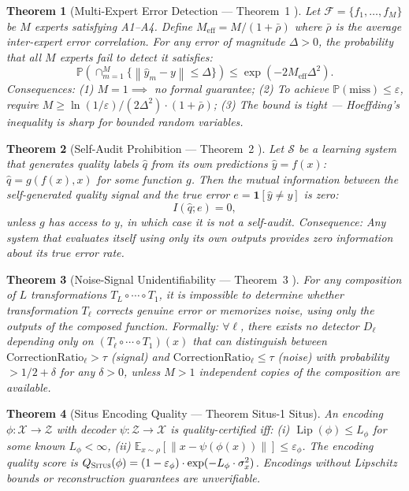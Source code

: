 \documentclass[12pt,a4paper]{article}
\newtheorem{theorem}{Theorem}[section]
\theoremstyle{definition}
\newcommand{\Situs}{\textsc{Situs}}
\DeclareMathOperator{\Lip}{Lip}
\newcommand{\E}{\mathbb{E}}
\newcommand{\Pbb}{\mathbb{P}}
\newcommand{\cF}{\mathcal{F}}
\newcommand{\cS}{\mathcal{S}}
\newcommand{\cX}{\mathcal{X}}
\newcommand{\cZ}{\mathcal{Z}}
\newcommand{\ind}[1]{\mathbf{1}[#1]}
\newcommand{\norm}[1]{\left\lVert#1\right\rVert}
\begin{document}
\begin{theorem}[Multi-Expert Error Detection — Theorem~1 ]
\label{thm:1_formal}
Let $\cF = \{f_1, \ldots, f_M\}$ be $M$ experts satisfying A1--A4. Define $M_{\text{eff}} = M/(1+\bar{\rho})$ where $\bar{\rho}$ is the average inter-expert error correlation. For any error of magnitude $\Delta > 0$, the probability that all $M$ experts fail to detect it satisfies:
\[
\Pbb(\cap_{m=1}^M \{\norm{\hat{y}_m - y} \le \Delta\}) \le \exp(-2M_{\text{eff}}\Delta^2).
\]
\textit{Consequences:} (1) $M=1 \implies$ no formal guarantee; (2) To achieve $\Pbb(\text{miss}) \le \varepsilon$, require $M \ge \ln(1/\varepsilon)/(2\Delta^2) \cdot (1+\bar{\rho})$; (3) The bound is tight — Hoeffding's inequality is sharp for bounded random variables.
\end{theorem}

\begin{theorem}[Self-Audit Prohibition — Theorem~2 ]
\label{thm:2_formal}
Let $\cS$ be a learning system that generates quality labels $\hat{q}$ from its own predictions $\hat{y} = f(x)$: $\hat{q} = g(f(x), x)$ for some function $g$. Then the mutual information between the self-generated quality signal and the true error $e = \ind{\hat{y} \neq y}$ is zero:
\[
I(\hat{q}; e) = 0,
\]
unless $g$ has access to $y$, in which case it is not a self-audit. \textit{Consequence:} Any system that evaluates itself using only its own outputs provides zero information about its true error rate.
\end{theorem}

\begin{theorem}[Noise-Signal Unidentifiability — Theorem~3 ]
\label{thm:3_formal}
For any composition of $L$ transformations $T_L \circ \cdots \circ T_1$, it is impossible to determine whether transformation $T_\ell$ corrects genuine error or memorizes noise, using only the outputs of the composed function. Formally: $\forall \ell$, there exists no detector $D_\ell$ depending only on $(T_\ell \circ \cdots \circ T_1)(x)$ that can distinguish between $\text{CorrectionRatio}_\ell > \tau$ (signal) and $\text{CorrectionRatio}_\ell \le \tau$ (noise) with probability $> 1/2 + \delta$ for any $\delta > 0$, unless $M>1$ independent copies of the composition are available.
\end{theorem}

\begin{theorem}[Situs Encoding Quality — Theorem Situs-1 Situs]
\label{thm:situs_formal}
An encoding $\phi: \cX \to \cZ$ with decoder $\psi: \cZ \to \cX$ is quality-certified iff: (i) $\Lip(\phi) \le L_\phi$ for some known $L_\phi < \infty$, (ii) $\E_{x \sim \rho}[\norm{x - \psi(\phi(x))}] \le \varepsilon_\phi$. The encoding quality score is $Q_{\Situs}(\phi) = (1-\varepsilon_\phi) \cdot \exp(-L_\phi \cdot \sigma_x^2)$. Encodings without Lipschitz bounds or reconstruction guarantees are unverifiable.
\end{theorem}
\end{document}
